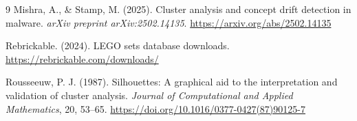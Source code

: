 \documentclass[11pt, letterpaper]{article}
\begin{document}
\begin{thebibliography}{9}
Mishra, A., \& Stamp, M. (2025).
\newblock Cluster analysis and concept drift detection in malware.
\newblock \textit{arXiv preprint arXiv:2502.14135}.
\newblock \url{https://arxiv.org/abs/2502.14135}

Rebrickable. (2024).
\newblock LEGO sets database downloads.
\newblock \url{https://rebrickable.com/downloads/}

Rousseeuw, P. J. (1987).
\newblock Silhouettes: A graphical aid to the interpretation and validation of cluster analysis.
\newblock \textit{Journal of Computational and Applied Mathematics}, 20, 53--65.
\newblock \url{https://doi.org/10.1016/0377-0427(87)90125-7}

\end{thebibliography}
\end{document}
